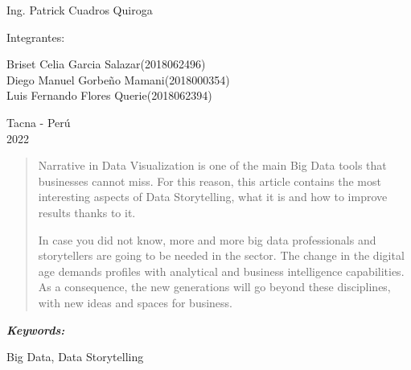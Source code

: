 \documentclass{article}
\providecommand{\keywords}[1]{
  \small	
  \textbf{\textit{\quad \quad Keywords: }} #1}
\begin{document}
\begin{titlepage}
\begin{center}
\vspace*{0.1in}
\begin{large}
 Ing. Patrick Cuadros Quiroga\\
\end{large}

\vspace*{0.2in}
\vspace*{0.1in}
\begin{large}

Integrantes: \\
\begin{flushleft}
Briset Celia Garcia Salazar\hfill(2018062496) \\
Diego Manuel Gorbeño Mamani\hfill(2018000354)\\
Luis Fernando Flores Querie\hfill(2018062394)\\

\end{flushleft}
\end{large}

\vspace*{0.1in}
\begin{large}
Tacna - Perú\\
2022
\end{large}
\end{center}
\end{titlepage}

\vspace*{\fill}
	
\begin{center}
    
\begin{abstract}
Narrative in Data Visualization is one of the main Big Data tools that businesses cannot miss. For this reason, this article contains the most interesting aspects of Data Storytelling, what it is and how to improve results thanks to it.

In case you did not know, more and more big data professionals and storytellers are going to be needed in the sector. The change in the digital age demands profiles with analytical and business intelligence capabilities. As a consequence, the new generations will go beyond these disciplines, with new ideas and spaces for business.
\quad 

 \end{abstract}
 
 
 \keywords{}
 
Big Data, Data Storytelling
\end{center}
\vspace*{\fill}
\end{document}
